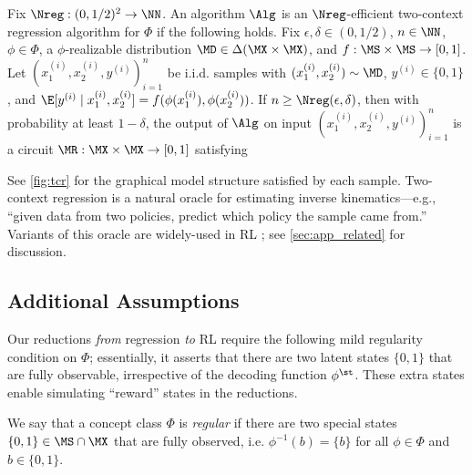 \begin{definition}\label{def:two-con-regression}
Fix $\Nreg: (0,1/2)^2 \to \NN$. An algorithm $\Alg$ is an $\Nreg$-efficient two-context regression algorithm for $\Phi$ if the following holds. Fix $\epsilon,\delta \in (0,1/2)$, $n \in \NN$, $\phi \in \Phi$, a $\phi$-realizable distribution $\MD \in \Delta(\MX\times\MX)$, and $f: \MS \times \MS \to [0,1]$. Let $(x_1^{(i)},x_2^{(i)},y^{(i)})_{i=1}^n$ be i.i.d. samples with $(x_1^{(i)},x_2^{(i)}) \sim \MD$, $y^{(i)} \in \{0,1\}$, and $\E[y^{(i)}\mid{}x_1^{(i)},x_2^{(i)}] = f(\phi(x_1^{(i)}),\phi(x_2^{(i)}))$. If $n \geq \Nreg(\epsilon,\delta)$, then with probability at least $1-\delta$, the output of $\Alg$ on input $(x_1^{(i)},x_2^{(i)},y^{(i)})_{i=1}^n$ is a circuit $\MR: \MX \times \MX \to [0,1]$ satisfying 
\end{definition}

See \cref{fig:tcr} for the graphical model structure satisfied by each sample. Two-context regression is a natural oracle for estimating inverse kinematics---e.g., ``given data from two policies, predict which policy the sample came from.'' Variants of this oracle are widely-used in RL \citep{misra2020kinematic,lamb2022guaranteed,mhammedi2023representation}; see \cref{sec:app_related} for discussion.

\subsection{Additional Assumptions}

Our reductions \emph{from} regression \emph{to} RL require the following mild regularity condition on $\Phi$; essentially, it asserts that there are two latent states $\{0,1\}$ that are fully observable, irrespective of the decoding function $\phi^\st$. These extra states enable simulating ``reward'' states in the reductions. %

\begin{definition}\label{def:regular}
We say that a concept class $\Phi$ is \emph{regular} if there are two special states $\{0,1\} \in \MS \cap \MX$ that are fully observed, i.e. $\phi^{-1}(b) = \{b\}$ for all $\phi\in\Phi$ and $b \in \{0,1\}$.\loose
\end{definition}




